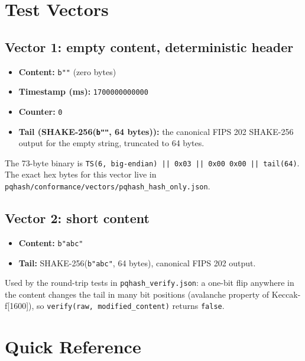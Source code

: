 \appendix

\section{Test Vectors}
\label{sec:appendix-vectors}

\subsection*{Vector 1: empty content, deterministic header}

\begin{itemize}
\item \textbf{Content:} \texttt{b""} (zero bytes)
\item \textbf{Timestamp (ms):} \texttt{1700000000000}
\item \textbf{Counter:} \texttt{0}
\item \textbf{Tail (SHAKE-256(\texttt{b""}, 64 bytes)):} the canonical FIPS 202 \citep{fips202} SHAKE-256 output for the empty string, truncated to 64 bytes.
\end{itemize}

The 73-byte binary is \texttt{TS(6, big-endian) || 0x03 || 0x00 0x00 || tail(64)}. The exact hex bytes for this vector live in \texttt{pqhash/conformance/vectors/pqhash\_hash\_only.json}.

\subsection*{Vector 2: short content}

\begin{itemize}
\item \textbf{Content:} \texttt{b"abc"}
\item \textbf{Tail:} SHAKE-256(\texttt{b"abc"}, 64 bytes), canonical FIPS 202 output.
\end{itemize}

Used by the round-trip tests in \texttt{pqhash\_verify.json}: a one-bit flip anywhere in the content changes the tail in many bit positions (avalanche property of Keccak-f[1600]), so \texttt{verify(raw, modified\_content)} returns \texttt{false}.

\section{Quick Reference}
\label{sec:appendix-quickref}

